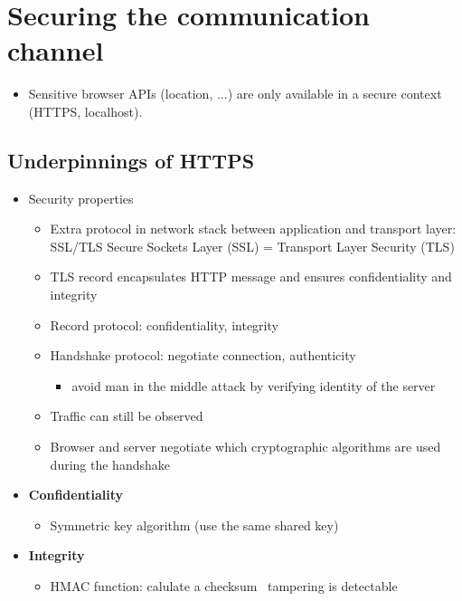 \documentclass[12pt,titlepage,a4paper]{report}
\begin{document}
	\section{Securing the communication channel}
	\begin{itemize}
		\item Sensitive browser APIs (location, ...) are only available in a secure context (HTTPS, localhost).
	\end{itemize}

	\subsection{Underpinnings of HTTPS}
	\begin{itemize}
		\item Security properties
		\begin{itemize}
			\item Extra protocol in network stack between application and transport layer: SSL/TLS
				\subitem Secure Sockets Layer (SSL) = Transport Layer Security (TLS)
			\item TLS record encapsulates HTTP message and ensures confidentiality and integrity
			\item Record protocol: confidentiality, integrity
			\item Handshake protocol: negotiate connection, authenticity
			\begin{itemize}
				\item avoid man in the middle attack by verifying identity of the server
			\end{itemize}
			\item Traffic can still be observed
			\item Browser and server negotiate which cryptographic algorithms are used during the handshake
		\end{itemize}
	
		\item \textbf{Confidentiality}
		\begin{itemize}
			\item Symmetric key algorithm (use the same shared key)
		\end{itemize}
	
		\item \textbf{Integrity}
		\begin{itemize}
			\item HMAC function: calulate a checksum \textrightarrow \, tampering is detectable
		\end{itemize}
	

\end{itemize}
\end{document}
